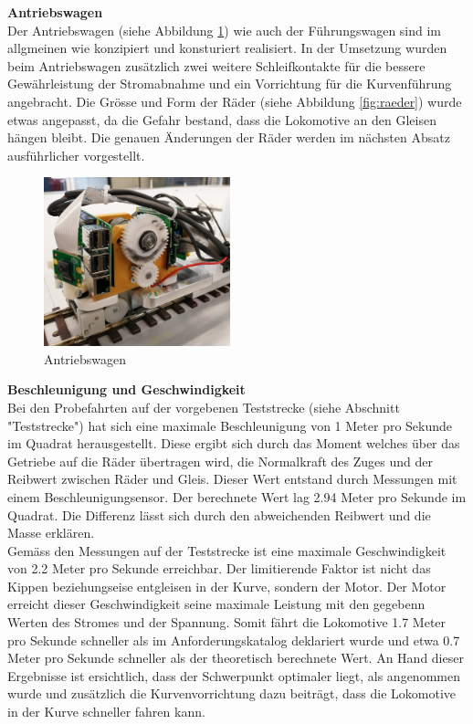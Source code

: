 \documentclass[../../main.tex]{subfiles}
\begin{document}
\textbf{Antriebswagen}\\
Der Antriebswagen (siehe Abbildung \ref{fig:antriebswagen3}) wie auch der Führungswagen sind im allgmeinen wie konzipiert und konsturiert realisiert. In der Umsetzung wurden beim Antriebswagen zusätzlich zwei weitere Schleifkontakte für die bessere Gewährleistung der Stromabnahme und ein Vorrichtung für die Kurvenführung angebracht. Die Grösse und Form der Räder (siehe Abbildung \ref{fig:raeder}) wurde etwas angepasst, da die Gefahr bestand, dass die Lokomotive an den Gleisen hängen bleibt. Die genauen Änderungen der Räder werden im nächsten Absatz ausführlicher vorgestellt.\\

\begin{figure}[H]
  \centering
  \includegraphics[width=0.48\textwidth]{antriebswagen1.PNG}
  \caption {Antriebswagen}
  \label{fig:antriebswagen3}
\end{figure}

\pagebreak

\textbf{Beschleunigung und Geschwindigkeit}\\
Bei den Probefahrten auf der vorgebenen Teststrecke (siehe Abschnitt "Teststrecke") hat sich eine maximale Beschleunigung von 1 Meter pro Sekunde im Quadrat herausgestellt. Diese ergibt sich durch das Moment welches über das Getriebe auf die Räder übertragen wird, die Normalkraft des Zuges und der Reibwert zwischen Räder und Gleis. Dieser Wert entstand durch Messungen mit einem Beschleunigungsensor. Der berechnete Wert lag 2.94 Meter pro Sekunde im Quadrat. Die Differenz lässt sich durch den abweichenden Reibwert und die Masse erklären.\\
Gemäss den Messungen auf der Teststrecke ist eine maximale Geschwindigkeit von 2.2 Meter pro Sekunde erreichbar. Der limitierende Faktor ist nicht das Kippen beziehungseise entgleisen in der Kurve, sondern der Motor. Der Motor erreicht dieser Geschwindigkeit seine maximale Leistung mit den gegebenn Werten des Stromes und der Spannung. Somit fährt die Lokomotive 1.7 Meter pro Sekunde schneller als im Anforderungskatalog deklariert wurde und etwa 0.7 Meter pro Sekunde schneller als der theoretisch berechnete Wert. An Hand dieser Ergebnisse ist ersichtlich, dass der Schwerpunkt optimaler liegt, als angenommen wurde und zusätzlich die Kurvenvorrichtung dazu beiträgt, dass die Lokomotive in der Kurve schneller fahren kann.\\
\end{document}

